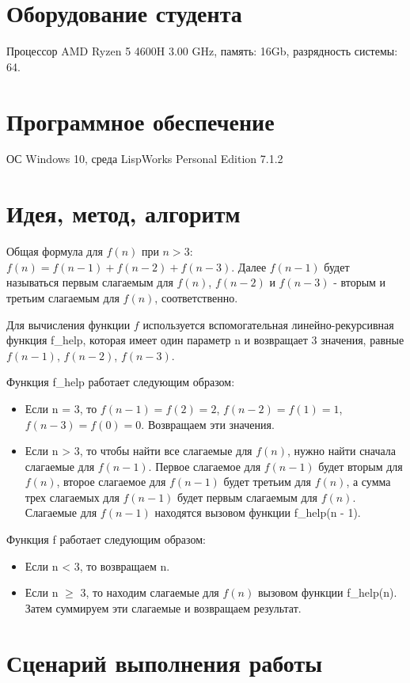 \documentclass[12pt]{article}
\begin{document}
\section{Оборудование студента}
Процессор AMD Ryzen 5 4600H 3.00 GHz, память: 16Gb, разрядность системы: 64.

\section{Программное обеспечение}
ОС Windows 10, среда LispWorks Personal Edition 7.1.2

\section{Идея, метод, алгоритм}

Общая формула для $f(n)$ при $n > 3$: $f(n) = f(n - 1) + f(n - 2) + f(n - 3)$. Далее $f(n - 1)$ будет называться первым слагаемым для $f(n)$, $f(n - 2)$ и $f(n - 3)$ - вторым и третьим слагаемым для $f(n)$, соответственно.

Для вычисления функции $f$ используется вспомогательная линейно-рекурсивная функция f\_help, которая имеет один параметр n и возвращает 3 значения, равные $f(n - 1)$, $f(n - 2)$, $f(n - 3)$.

Функция f\_help работает следующим образом:
\begin{itemize}
    \item Если n = 3, то $f(n - 1) = f(2) = 2$, $f(n - 2) = f(1) = 1$, $f(n - 3) = f(0) = 0$. Возвращаем эти значения.
    \item Если n > 3, то чтобы найти все слагаемые для $f(n)$, нужно найти сначала слагаемые для $f(n - 1)$. Первое слагаемое для $f(n - 1)$ будет вторым для $f(n)$, второе слагаемое для $f(n - 1)$ будет третьим для $f(n)$, а сумма трех слагаемых для $f(n - 1)$ будет первым слагаемым для $f(n)$. Слагаемые для $f(n - 1)$ находятся вызовом функции f\_help(n - 1).
\end{itemize}

Функция f работает следующим образом:
\begin{itemize}
    \item Если n < 3, то возвращаем n.
    \item Если n $\geq$ 3, то находим слагаемые для $f(n)$ вызовом функции f\_help(n). Затем суммируем эти слагаемые и возвращаем результат.
\end{itemize}

\section{Сценарий выполнения работы}
\end{document}
